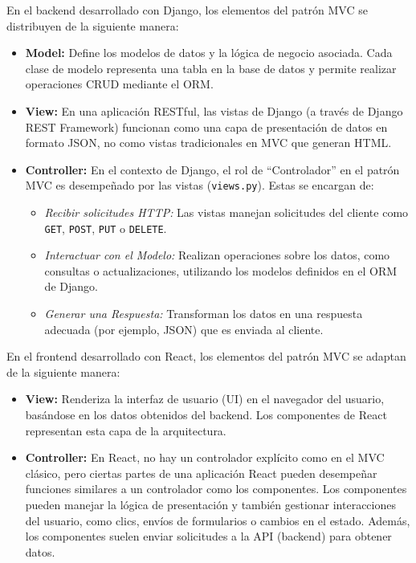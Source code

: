 \documentclass{report}
\begin{document}
\begin{itemize}
        En el backend desarrollado con Django, los elementos del patrón MVC se distribuyen de la siguiente manera:

        \begin{itemize}
            \item \textbf{Model:} Define los modelos de datos y la lógica de negocio asociada. Cada clase de modelo representa una tabla en la base de datos y permite realizar operaciones CRUD mediante el ORM.
            
            \item \textbf{View:} En una aplicación RESTful, las vistas de Django (a través de Django REST Framework) funcionan como una capa de presentación de datos en formato JSON, no como vistas tradicionales en MVC que generan HTML.

            \item \textbf{Controller:} En el contexto de Django, el rol de ``Controlador'' en el patrón MVC es desempeñado por las vistas (\texttt{views.py}). Estas se encargan de:
                \begin{itemize}
                    \item \textit{Recibir solicitudes HTTP:} Las vistas manejan solicitudes del cliente como \texttt{GET}, \texttt{POST}, \texttt{PUT} o \texttt{DELETE}.
                    \item \textit{Interactuar con el Modelo:} Realizan operaciones sobre los datos, como consultas o actualizaciones, utilizando los modelos definidos en el ORM de Django.
                    \item \textit{Generar una Respuesta:} Transforman los datos en una respuesta adecuada (por ejemplo, JSON) que es enviada al cliente.
                \end{itemize}
        \end{itemize}

        En el frontend desarrollado con React, los elementos del patrón MVC se adaptan de la siguiente manera:

        \begin{itemize}
            \item \textbf{View:} Renderiza la interfaz de usuario (UI) en el navegador del usuario, basándose en los datos obtenidos del backend. Los componentes de React representan esta capa de la arquitectura.

            \item \textbf{Controller:} En React, no hay un controlador explícito como en el MVC clásico, pero ciertas partes de una aplicación React pueden desempeñar funciones similares a un controlador como los componentes. Los componentes pueden manejar la lógica de presentación y también gestionar interacciones del usuario, como clics, envíos de formularios o cambios en el estado. Además, los componentes suelen enviar solicitudes a la API (backend) para obtener datos.
        \end{itemize}
    \end{itemize}
\end{document}
